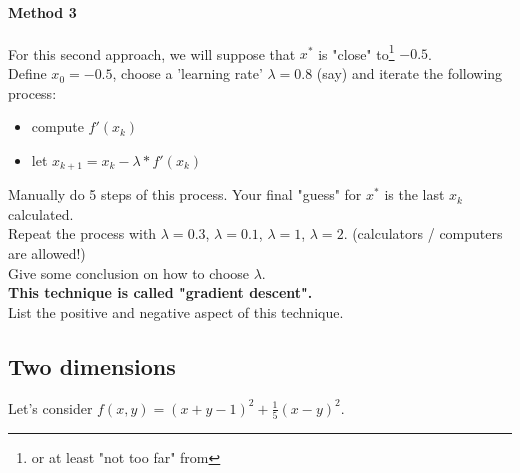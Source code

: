 \documentclass[]{article}
\begin{document}
	\paragraph{Method 3}
	For this second approach, we will suppose that $x^*$ is "close" to\footnote{or at least "not too far" from} $-0.5$.\\
	Define $x_0=-0.5$, choose a 'learning rate' $\lambda=0.8$ (say) and iterate the following process:
	\begin{itemize}
		\item compute $f'(x_k)$
		\item let $x_{k+1} = x_k - \lambda * f'(x_k)$
	\end{itemize}
	Manually do 5 steps of this process.
	Your final "guess" for $x^*$ is the last $x_k$ calculated.\\
	Repeat the process with $\lambda=0.3$, $\lambda=0.1$, $\lambda=1$, $\lambda=2$. (calculators / computers are allowed!)\\
	Give some conclusion on how to choose $\lambda$.\\
	\textbf{This technique is called "gradient descent".}\\
	List the positive and negative aspect of this technique.
	
	\subsection{Two dimensions}
	Let's consider $f(x,y) = (x+y-1)^2 + \frac{1}{5}(x-y)^2$.
	
	
	
	
	
	
\end{document}
